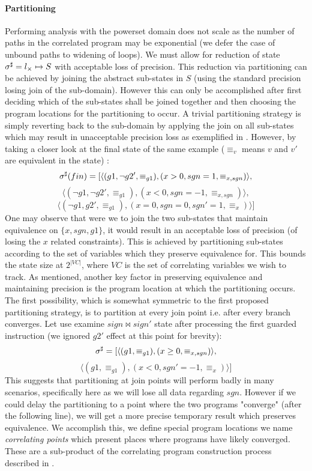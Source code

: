 \paragraph{Partitioning}
Performing analysis with the powerset domain does not scale as the number of paths in the correlated program may be exponential (we defer the case of unbound paths to widening of loops). We must allow for reduction of state $\sigma^\sharp = l_{\times} \mapsto S$ with acceptable loss of precision. This reduction via partitioning can be achieved by joining the abstract sub-states in $S$ (using the standard precision losing join of the sub-domain). However this can only be accomplished after first deciding which of the sub-states shall be joined together and then choosing the program locations for the partitioning to occur. A trivial partitioning strategy is simply reverting back to the sub-domain by applying the join on all sub-states which may result in unacceptable precision loss as exemplified in . However, by taking a closer look at the final state of the same example ($\equiv_{v}$ means $v$ and $v'$ are equivalent in the state) :
\[
\sigma^\sharp(fin) = [ \langle (g1,\neg g2',\equiv_{g1}),(x>0,sgn=1,\equiv_{x,sgn}) \rangle,
\]
\[
\langle (\neg g1,\neg g2',\equiv_{g1}), (x<0,sgn=-1,\equiv_{x,sgn}) \rangle,
\]
\[
\langle (\neg g1,g2',\equiv_{g1}),(x=0,sgn=0,sgn'=1,\equiv_{x}) \rangle ]
\]
One may observe that were we to join the two sub-states that maintain equivalence on $\{x,sgn,g1\}$, it would result in an acceptable loss of precision (of losing the $x$ related constraints). This is achieved by partitioning sub-states according to the set of variables which they preserve equivalence for. This bounds the state size at $2^{|VC|}$, where $VC$ is the set of correlating variables we wish to track.
As mentioned, another key factor in preserving equivalence and maintaining precision is the program location at which the partitioning occurs. The first possibility, which is somewhat symmetric to the first proposed partitioning strategy, is to partition at every join point i.e. after every branch converges. Let use examine $sign \bowtie sign'$ state after processing the first guarded instruction  (we ignored $g2'$ effect at this point for brevity):
\[
\sigma^\sharp = [ \langle (g1,\equiv_{g1}),(x \geq 0,\equiv_{x,sgn}) \rangle,
\]
\[
\langle (g1,\equiv_{g1}),(x < 0,sgn' = -1, \equiv_{x}) \rangle ]
\]
This suggests that partitioning at join points will perform badly in many scenarios, specifically here as we will lose all data regarding $sgn$. However if we could delay the partitioning to a point where the two programs "converge" (after the following  line), we will get a more precise temporary result which preserves equivalence. We accomplish this, we define special program locations we name \emph{correlating points} which present places where programs have likely converged. These are a sub-product of the correlating program construction process described in .

